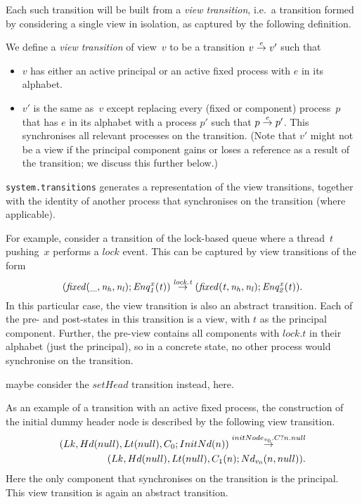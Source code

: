 Each such transition will be built from a \emph{view transition}, i.e.~a
transition formed by considering a single view in isolation, as captured by
the following definition.
%
\begin{definition}
We define a \emph{view transition} of view~$v$ to be a transition $v \stackrel{e}\rightarrow
v'$ such that
%
\begin{itemize}
\item $v$ has either an active principal or an active fixed process with $e$
  in its alphabet.

\item $v'$ is the same as~$v$ except replacing every (fixed or component)
  process~$p$ that has $e$ in its alphabet with a process $p'$ such that \( p
  \stackrel{e}\rightarrow p' \).  This synchronises all relevant processes on the
  transition. (Note that $v'$ might not be a view if the principal component
  gains or loses a reference as a result of the transition; we discuss this
  further below.)
\end{itemize}
\end{definition}

\begin{impNote}
\texttt{system.transitions} generates a representation of the view
  transitions, together with the identity of another process that synchronises
  on the transition (where applicable).
\end{impNote}

For example, consider a transition of the lock-based queue where a thread~$t$
pushing~$x$ performs a $lock$ event.  This can be captured by view transitions
of the form
%
\begin{equation}\it
(fixed(\_, n_h, n_l); Enq^x_1(t))  \stackrel{lock.t}\rightarrow
  (fixed(t, n_h, n_l); Enq^x_2(t)) .
\label{trans:lock}
\end{equation}
%
%
In this particular case, the view transition is also an abstract transition.
Each of the pre- and post-states in this transition is a view, with $t$ as the
principal component.  Further, the pre-view contains all components with
$lock.t$ in their alphabet (just the principal), so in a concrete state, no
other process would synchronise on the transition.

 maybe consider the $setHead$ transition instead, here. 

As an example of a transition with an active fixed process, the construction
of the initial dummy header node is described by the following view
transition.
\[
\begin{align}
(Lk, Hd(null), Lt(null), C_0; InitNd(n)) 
  \stackrel{initNode_{v_0}.C?n.null}\rightarrow \\
\qquad (Lk, Hd(null), Lt(null), C_1(n); Nd_{v_0}(n, null)).
\end{align}
\]
Here the only component that synchronises on the transition is the principal.
This view transition is again an abstract transition.

